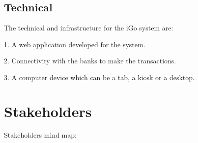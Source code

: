 \documentclass[12pt]{report}
\begin{document}
\vspace{\baselineskip}
\subsection{Technical}

The technical and infrastructure for the iGo system are:\par

1. A web application developed for the system.\par

2. Connectivity with the banks to make the transactions.\par

3. A computer device which can be a tab, a kiosk or a desktop.\par


\vspace{\baselineskip}


\section{Stakeholders}

{\fontsize{14pt}{16.8pt}\selectfont Stakeholders mind map:\par}\par



\end{document}
